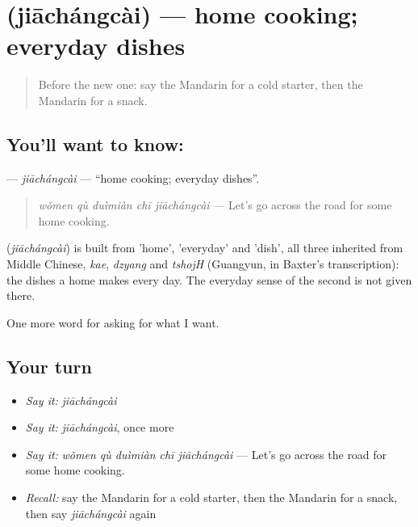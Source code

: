 \section[\texorpdfstring{\zh{家常菜} (jiāchángcài)}{家常菜 (jiāchángcài)}]{ (jiāchángcài) — home cooking; everyday dishes}

\label{lesson:ZH-C182-jiachangcai}



\begin{quote}
Before the new one: say the Mandarin for a cold starter, then the Mandarin for a snack.
\end{quote}

\subsection*{You'll want to know: }
\textbf{} — \emph{jiāchángcài} — \textquotedblleft{}home cooking; everyday dishes\textquotedblright{}.

\begin{quote}
\textbf{} \emph{wǒmen qù duìmiàn chī jiāchángcài} — Let's go across the road for some home cooking.
\end{quote}

\begin{cousinweb}
\textbf{} (\emph{jiāchángcài}) is built from  'home',  'everyday' and  'dish', all three inherited from Middle Chinese, \emph{kae}, \emph{dzyang} and \emph{tshojH} (Guangyun, in Baxter's transcription): the dishes a home makes every day. The everyday sense of the second is not given there.
\end{cousinweb}

\begin{grammarlens}[title={What you've built}]
One more word for asking for what I want.
\end{grammarlens}

\subsection*{Your turn}
\begin{itemize}
\raggedright
  \item \emph{Say it:} \emph{jiāchángcài}
  \item \emph{Say it:} \emph{jiāchángcài}, once more
  \item \emph{Say it:} \emph{wǒmen qù duìmiàn chī jiāchángcài} — Let's go across the road for some home cooking.
  \item \emph{Recall:} say the Mandarin for a cold starter, then the Mandarin for a snack, then say \emph{jiāchángcài} again
\end{itemize}

